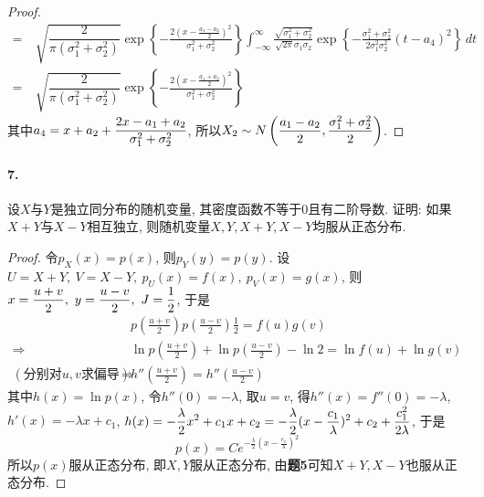 \documentclass[12pt, a4paper, oneside]{ctexart}
\begin{document}
\begin{proof}
\begin{equation*}
\begin{aligned}
            =&\ \sqrt{\dfrac{2}{\pi(\sigma_1^2+\sigma_2^2)}}\exp\left\{-\frac{2\left(x-\frac{a_1-a_2}{2}\right)^2}{\sigma_1^2+\sigma_2^2}\right\}\int_{-\infty}^{\infty}\frac{\sqrt{\sigma_1^2+\sigma_2^2}}{\sqrt{2\pi}\sigma_1\sigma_2}\exp\left\{-\frac{\sigma_1^2+\sigma_2^2}{2\sigma_1^2\sigma_2^2}\left(t-a_4\right)^2\right\}\,dt\\
            =&\ \sqrt{\dfrac{2}{\pi(\sigma_1^2+\sigma_2^2)}}\exp\left\{-\frac{2\left(x-\frac{a_1+a_2}{2}\right)^2}{\sigma_1^2+\sigma_2^2}\right\}
        \end{aligned}
    \end{equation*}
    其中$\displaystyle a_4 = x+a_2+\frac{2x-a_1+a_2}{\sigma_1^2+\sigma_2^2}$, 所以$\displaystyle X_2\sim N\left(\frac{a_1-a_2}{2},\frac{\sigma_1^2+\sigma_2^2}{2}\right)$.
\end{proof}
\paragraph{7.}设$X$与$Y$是独立同分布的随机变量, 其密度函数不等于$0$且有二阶导数. 证明: 如果$X+Y$与$X-Y$相互独立, 则随机变量$X, Y, X+Y, X-Y$均服从正态分布.
\begin{proof}
    令$p_X(x) = p(x)$, 则$p_Y(y) = p(y)$. 设$U = X+Y,\ V = X-Y,\ p_U(x) = f(x),\ p_V(x) = g(x)$, 则
    $\displaystyle x = \frac{u+v}{2},\ y = \frac{u-v}{2},\ J = \frac{1}{2}$, 于是
    \begin{equation*}
        \begin{aligned}
            &\ p(\frac{u+v}{2})p(\frac{u-v}{2})\frac{1}{2}=f(u)g(v)\\
            \Rightarrow&\ \ln p(\frac{u+v}{2})+\ln p(\frac{u-v}{2}) -\ln 2 = \ln f(u)+ \ln g(v)\\
            (\text{分别对}u,v\text{求偏导})\Rightarrow&\ h''(\frac{u+v}{2})=h''(\frac{u-v}{2})
        \end{aligned}
    \end{equation*}
    其中$h(x) = \ln p(x)$, 令$h''(0) = -\lambda$, 取$u = v$, 得$h''(x) = f''(0) = -\lambda$, $h'(x) = -\lambda x + c_1$, $\displaystyle h(x) = -\frac{\lambda}{2}x^2+c_1x+c_2 = -\frac{\lambda}{2}(x-\frac{c_1}{\lambda})^2+c_2+\frac{c_1^2}{2\lambda}$, 于是
    \begin{equation*}
        p(x) = Ce^{-\frac{\lambda}{2}(x-\frac{c_1}{\lambda})^2}
    \end{equation*}
    所以$p(x)$服从正态分布, 即$X,Y$服从正态分布, 由\textbf{题5}可知$X+Y, X-Y$也服从正态分布.
\end{proof}
\end{document}
